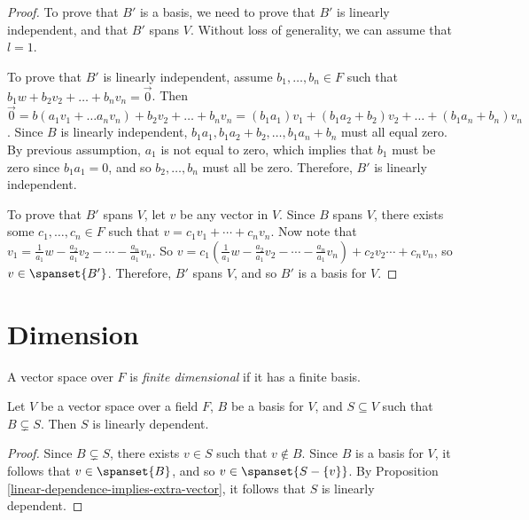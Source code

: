 \documentclass[12pt]{article}
\begin{document}
\begin{proof}
    To prove that $B'$ is a basis, we need to prove that $B'$ is linearly independent, and that $B'$ spans $V$. Without loss of generality, we can assume that $l = 1$.

    To prove that $B'$ is linearly independent, assume $b_1, \ldots, b_n \in F$ such that $b_1w + b_2v_2 + \ldots + b_nv_n = \vec{0}$. Then $\vec{0} = b(a_1v_1 + \ldots a_nv_n) + b_2v_2 + \ldots + b_nv_n = (b_1a_1)v_1 + (b_1a_2 + b_2)v_2 + \ldots + (b_1a_n + b_n)v_n$. Since $B$ is linearly independent, $b_1a_1, b_1a_2 + b_2, \ldots, b_1a_n + b_n$ must all equal zero. By previous assumption, $a_1$ is not equal to zero, which implies that $b_1$ must be zero since $b_1a_1 = 0$, and so $b_2, \ldots, b_n$ must all be zero. Therefore, $B'$ is linearly independent.

    To prove that $B'$ spans $V$, let $v$ be any vector in $V$. Since $B$ spans $V$, there exists some $c_1, \ldots, c_n \in F$ such that $v = c_1v_1 + \cdots + c_nv_n$. Now note that $v_1 = \frac{1}{a_1}w - \frac{a_2}{a_1}v_2 - \cdots - \frac{a_n}{a_1}v_n$. So $v = c_1\left(\frac{1}{a_1}w - \frac{a_2}{a_1}v_2 - \cdots - \frac{a_n}{a_1}v_n\right) + c_2v_2 \cdots + c_nv_n$, so $v \in \spanset{B'}$. Therefore, $B'$ spans $V$, and so $B'$ is a basis for $V$.
\end{proof}

\section{Dimension}

\begin{defn}\label{finite-dimensional-defn}
    A vector space over $F$ is \emph{finite dimensional} if it has a finite basis.
\end{defn}

\begin{lemma}\label{basis-maximal-independent-subset}
    Let $V$ be a vector space over a field $F$, $B$ be a basis for $V$, and $S \subseteq V$ such that $B \subsetneq S$. Then $S$ is linearly dependent.
\end{lemma}

\begin{proof}
    Since $B \subsetneq S$, there exists $v \in S$ such that $v \notin B$. Since $B$ is a basis for $V$, it follows that $v \in \spanset{B}$, and so $v \in \spanset{S - \{v\}}$. By Proposition \ref{linear-dependence-implies-extra-vector}, it follows that $S$ is linearly dependent.
\end{proof}
\end{document}
